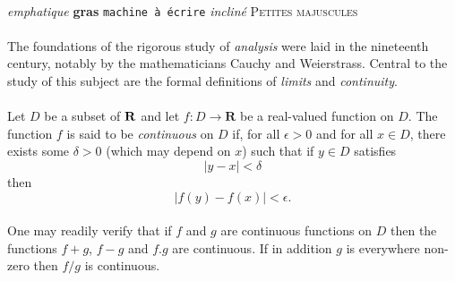 \documentclass[a4paper,10pt]{report}
\begin{document}
            \paragraph{}
                \emph{emphatique}
                \textbf{gras}
                \texttt{machine à écrire}
                \textsl{incliné}
                \textsc{Petites majuscules}

            \paragraph{}
                The foundations of the rigorous study of \emph{analysis}
                were laid in the nineteenth century, notably by the
                mathematicians Cauchy and Weierstrass. Central to the
                study of this subject are the formal definitions of
                \emph{limits} and \emph{continuity}.

            \paragraph{}
                Let $D$ be a subset of $\bf R$ and let
                $f \colon D \to \mathbf{R}$ be a real-valued function on
                $D$. The function $f$ is said to be \emph{continuous} on
                $D$ if, for all $\epsilon > 0$ and for all $x \in D$,
                there exists some $\delta > 0$ (which may depend on $x$)
                such that if $y \in D$ satisfies
                \[ |y - x| < \delta \]
                then
                \[ |f(y) - f(x)| < \epsilon. \]

            \paragraph{}
                One may readily verify that if $f$ and $g$ are continuous
                functions on $D$ then the functions $f+g$, $f-g$ and
                $f.g$ are continuous. If in addition $g$ is everywhere
                non-zero then $f/g$ is continuous.


    \listoffigures
\end{document}
